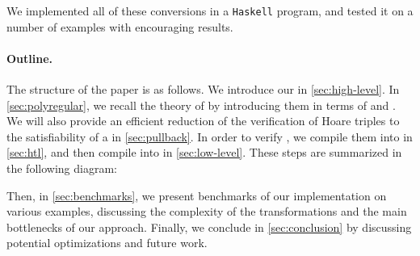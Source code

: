 We implemented all of these conversions in a \texttt{Haskell} program, and
tested it on a number of examples with encouraging results. 


\paragraph{Outline.} The structure of the paper is as follows. We introduce our
 in \cref{sec:high-level}. In \cref{sec:polyregular},
we recall the theory of  by introducing them in terms
of  and . We will also
provide an efficient reduction of the verification of Hoare triples to the
satisfiability of a  in \cref{sec:pullback}.
In order to verify , we compile them into  in \cref{sec:htl}, and then compile  into
 in \cref{sec:low-level}. These steps 
are summarized in the following diagram:
\begin{center}
\end{center}
Then, in \cref{sec:benchmarks}, we present
benchmarks of our implementation on various examples, discussing
the complexity of the transformations and the main bottlenecks of our approach.
Finally, we conclude in \cref{sec:conclusion} by discussing potential
optimizations and future work.


